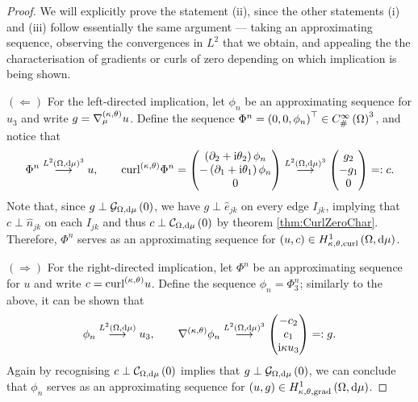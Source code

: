 \begin{proof}
	We will explicitly prove the statement (ii), since the other statements (i) and (iii) follow essentially the same argument --- taking an approximating sequence, observing the convergences in $L^2$ that we obtain, and appealing the the characterisation of gradients or curls of zero depending on which implication is being shown.
	
	$(\Leftarrow)$ For the left-directed implication, let $\phi_n$ be an approximating sequence for $u_3$ and write $g = \nabla^{\left( \kappa, \theta \right)}_{\mu}u$.
	Define the sequence $\Phi^n = \left( 0,0,\phi_n \right)^\top\in C^{\infty}_{\#}\left( \Omega \right)^3$, and notice that
	\begin{align*}
		\Phi^n\overset{L^{2}\left( \Omega,\mathrm{d} \mu \right)^3}{\longrightarrow}u, \qquad
		\mathrm{curl}_{}^{\left( \kappa, \theta \right)}\Phi^n = 
		\begin{pmatrix} 
			\left( \partial_2+\mathrm{i}\theta_2 \right)\phi_n \\ -\left( \partial_1 + \mathrm{i}\theta_1 \right)\phi_n \\ 0 
		\end{pmatrix}
		\overset{L^{2}\left( \Omega,\mathrm{d} \mu \right)^3}{\longrightarrow}
		\begin{pmatrix}
			g_2 \\ -g_1 \\ 0
		\end{pmatrix}
		=: c.
	\end{align*}
	Note that, since $g\perp\mathcal{G}_{ \Omega, \mathrm{d}\mu}\left( 0 \right)$, we have $g\perp\widehat{e}_{jk}$ on every edge $I_{jk}$, implying that $c\perp\widehat{n}_{jk}$ on each $I_{jk}$ and thus $c\perp\mathcal{C}_{ \Omega, \mathrm{d}\mu}\left( 0 \right)$ by theorem \ref{thm:CurlZeroChar}.
	Therefore, $\Phi^n$ serves as an approximating sequence for $\left( u,c \right)\in H^1_{\kappa,\theta,\mathrm{curl}}\left( \Omega, \mathrm{d}\mu \right)$.
	
	$(\Rightarrow)$ For the right-directed implication, let $\Phi^n$ be an approximating sequence for $u$ and write $c=\mathrm{curl}_{}^{\left( \kappa, \theta \right)}u$.
	Define the sequence $\phi_n = \Phi^n_3$; similarly to the above, it can be shown that
	\begin{align*}
		\phi_n \overset{L^{2}\left( \Omega,\mathrm{d} \mu \right)}{\longrightarrow} u_3, \qquad
		\nabla^{\left( \kappa, \theta \right)}\phi_n \overset{L^{2}\left( \Omega,\mathrm{d} \mu \right)^3}{\longrightarrow} \begin{pmatrix} -c_2 \\ c_1 \\ \mathrm{i}\kappa u_3 \end{pmatrix}
		=: g.
	\end{align*}
	Again by recognising $c\perp\mathcal{C}_{ \Omega, \mathrm{d}\mu}\left( 0 \right)$ implies that $g\perp\mathcal{G}_{ \Omega, \mathrm{d}\mu}\left( 0 \right)$, we can conclude that $\phi_n$ serves as an approximating sequence for $\left( u,g \right)\in H^1_{\kappa,\theta,\mathrm{grad}}\left( \Omega, \mathrm{d}\mu \right)$.
\end{proof}

